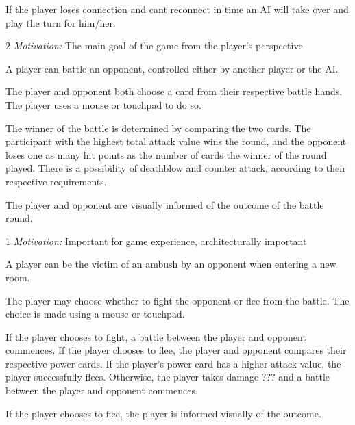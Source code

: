  If the player loses connection and cant reconnect in time an AI will take over and play the turn for him/her. 

2 \emph{Motivation:} The main goal of the game from the player's perspective

\stoprequirement



A player can battle an opponent, controlled either by another player or the AI.

The player and opponent both choose a card from their respective battle hands. The player uses a mouse or touchpad to do so.

The winner of the battle is determined by comparing the two cards. The participant with the highest total attack value wins the round, and the opponent loses one as many hit points as the number of cards the winner of the round played. There is a possibility of deathblow and counter attack, according to their respective requirements.

The player and opponent are visually informed of the outcome of the battle round.

1 \emph{Motivation:} Important for game experience, architecturally important

\stoprequirement


A player can be the victim of an ambush by an opponent when entering a new room.

The player may choose whether to fight the opponent or flee from the battle. The choice is made using a mouse or touchpad.

If the player chooses to fight, a battle between the player and opponent commences. If the player chooses to flee, the player and opponent compares their respective power cards. If the player's power card has a higher attack value, the player successfully flees. Otherwise, the player takes damage ??? and a battle between the player and opponent commences.

If the player chooses to flee, the player is informed visually of the outcome.

